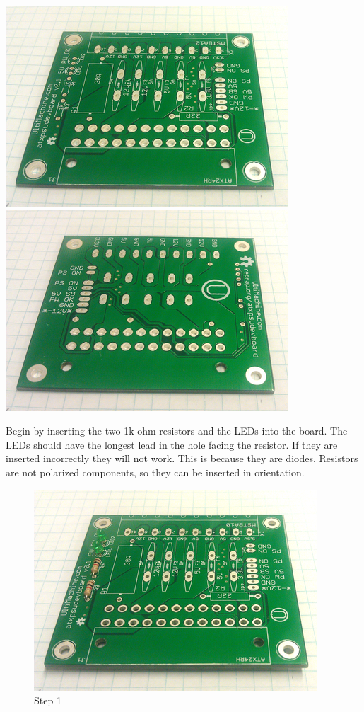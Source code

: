 \includegraphics{./png/correct-side.png}
\includegraphics{./png/incorrect-side.png}

Begin by inserting the two 1k ohm resistors and the LEDs into the board.
The LEDs should have the longest lead in the hole facing the resistor.
If they are inserted incorrectly they will not work. This is because
they are diodes. Resistors are not polarized components, so they can be
inserted in orientation.

\begin{figure}[htbp]
\centering
\includegraphics{./png/step-01.png}
\caption{Step 1}
\end{figure}

